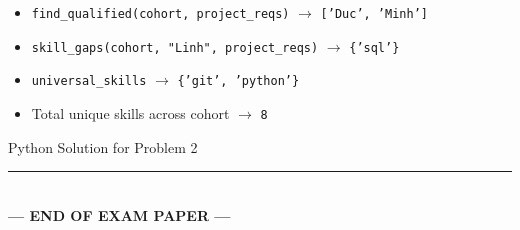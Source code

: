 \documentclass[11pt,a4paper]{article}
\begin{document}
\begin{itemize}
\item \texttt{find\_qualified(cohort, project\_reqs)} $\rightarrow$ \texttt{['Duc', 'Minh']}
\item \texttt{skill\_gaps(cohort, "Linh", project\_reqs)} $\rightarrow$ \texttt{\{'sql'\}}
\item \texttt{universal\_skills} $\rightarrow$ \texttt{\{'git', 'python'\}}
\item Total unique skills across cohort $\rightarrow$ \texttt{8}
\end{itemize}
\begin{answerbox}[height=9.2cm]{Python Solution for Problem 2}\end{answerbox}
\vfill
\begin{center}\rule{0.5\textwidth}{0.4pt}\\[1mm]
\textbf{\color{primaryblue}--- END OF EXAM PAPER ---}
\end{center}
\end{document}
